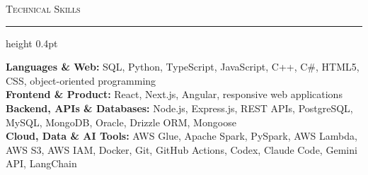 \documentclass[letterpaper,11pt]{article}
\newcommand{\resumesection}[1]{%
  \par\vspace{2pt}%
  {\large\scshape #1}\par\vspace{2pt}%
  \hrule height 0.4pt\vspace{2pt}%
}
\begin{document}
\resumesection{Technical Skills}
\textbf{Languages \& Web:} SQL, Python, TypeScript, JavaScript, C++, C\#, HTML5, CSS, object-oriented programming\\
\textbf{Frontend \& Product:} React, Next.js, Angular, responsive web applications\\
\textbf{Backend, APIs \& Databases:} Node.js, Express.js, REST APIs, PostgreSQL, MySQL, MongoDB, Oracle, Drizzle ORM, Mongoose\\
\textbf{Cloud, Data \& AI Tools:} AWS Glue, Apache Spark, PySpark, AWS Lambda, AWS S3, AWS IAM, Docker, Git, GitHub Actions, Codex, Claude Code, Gemini API, LangChain
\end{document}
